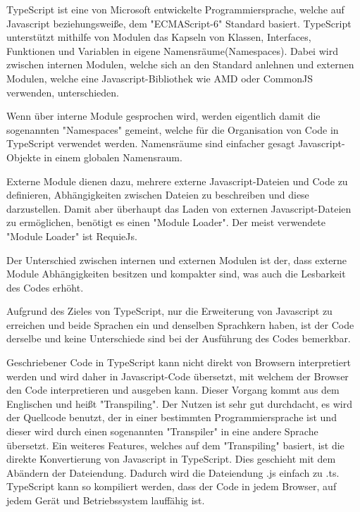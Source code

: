 \label{sec:TypeScript}

TypeScript ist eine von Microsoft entwickelte Programmiersprache, welche auf Javascript beziehungsweiße, dem "ECMAScript-6" Standard basiert. TypeScript unterstützt mithilfe von Modulen das Kapseln von Klassen, Interfaces, Funktionen und Variablen in eigene Namensräume(Namespaces). Dabei wird zwischen internen Modulen, welche sich an den Standard anlehnen und externen Modulen, welche eine Javascript-Bibliothek wie AMD oder CommonJS verwenden, unterschieden. \cite{TypeScript} \cite{ECMAScript6}

Wenn über interne Module gesprochen wird, werden eigentlich damit die sogenannten "Namespaces" gemeint, welche für die Organisation von Code in TypeScript verwendet werden. Namensräume sind einfacher gesagt Javascript-Objekte in einem globalen Namensraum. \cite{IntModules}

Externe Module dienen dazu, mehrere externe Javascript-Dateien und Code zu definieren, Abhängigkeiten zwischen Dateien zu beschreiben und diese darzustellen. Damit aber überhaupt das Laden von externen Javascript-Dateien zu ermöglichen, benötigt es einen "Module Loader". Der meist verwendete "Module Loader" ist RequieJs. \cite{ExtModules}

Der Unterschied zwischen internen und externen Modulen ist der, dass externe Module Abhängigkeiten besitzen und kompakter sind, was auch die Lesbarkeit des Codes erhöht. \cite{TypeScript}





Aufgrund des Zieles von TypeScript, nur die Erweiterung von Javascript zu erreichen und beide Sprachen ein und denselben Sprachkern haben, ist der Code derselbe und keine Unterschiede sind bei der Ausführung des Codes bemerkbar. 
\cite{TypeScript}


Geschriebener Code in TypeScript kann nicht direkt von Browsern interpretiert werden und wird daher in Javascript-Code übersetzt, mit welchem der Browser den Code interpretieren und ausgeben kann. Dieser Vorgang kommt aus dem Englischen und heißt "Transpiling". Der Nutzen ist sehr gut durchdacht, es wird der Quellcode benutzt, der in einer bestimmten Programmiersprache ist und dieser wird durch einen sogenannten "Transpiler" in eine andere Sprache übersetzt. Ein weiteres Features, welches auf dem "Transpiling" basiert, ist die direkte Konvertierung von Javascript in TypeScript. Dies geschieht mit dem Abändern der Dateiendung. Dadurch wird die Dateiendung .js einfach zu .ts. TypeScript kann so kompiliert werden, dass der Code in jedem Browser, auf jedem Gerät und Betriebssystem lauffähig ist. \cite{Differnces}


